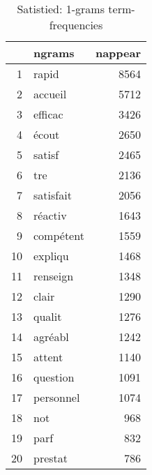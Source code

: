 \begin{table}[ht]
\centering
\begin{tabular}{rlr}
  \hline
 & ngrams & nappear \\ 
  \hline
1 & rapid & 8564 \\ 
  2 & accueil & 5712 \\ 
  3 & efficac & 3426 \\ 
  4 & écout & 2650 \\ 
  5 & satisf & 2465 \\ 
  6 & tre & 2136 \\ 
  7 & satisfait & 2056 \\ 
  8 & réactiv & 1643 \\ 
  9 & compétent & 1559 \\ 
  10 & expliqu & 1468 \\ 
  11 & renseign & 1348 \\ 
  12 & clair & 1290 \\ 
  13 & qualit & 1276 \\ 
  14 & agréabl & 1242 \\ 
  15 & attent & 1140 \\ 
  16 & question & 1091 \\ 
  17 & personnel & 1074 \\ 
  18 & not & 968 \\ 
  19 & parf & 832 \\ 
  20 & prestat & 786 \\ 
   \hline
\end{tabular}
\caption{Satistied: 1-grams term-frequencies} 
\label{tab:tf_sup_1}
\end{table}

